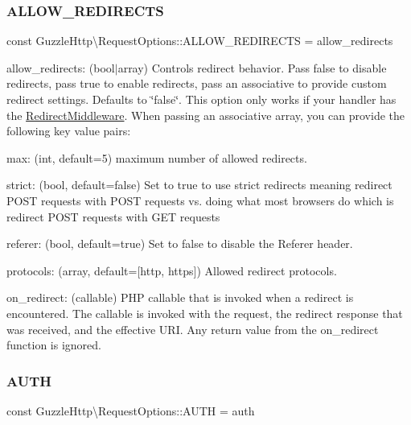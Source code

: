 \subsubsection{\texorpdfstring{A\+L\+L\+O\+W\+\_\+\+R\+E\+D\+I\+R\+E\+C\+TS}{ALLOW\_REDIRECTS}}
{\footnotesize\ttfamily const Guzzle\+Http\textbackslash{}\+Request\+Options\+::\+A\+L\+L\+O\+W\+\_\+\+R\+E\+D\+I\+R\+E\+C\+TS = \textquotesingle{}allow\+\_\+redirects\textquotesingle{}}

allow\+\_\+redirects\+: (bool$\vert$array) Controls redirect behavior. Pass false to disable redirects, pass true to enable redirects, pass an associative to provide custom redirect settings. Defaults to \char`\"{}false\char`\"{}. This option only works if your handler has the \hyperlink{classGuzzleHttp_1_1RedirectMiddleware}{Redirect\+Middleware}. When passing an associative array, you can provide the following key value pairs\+:


\begin{DoxyItemize}
\item max\+: (int, default=5) maximum number of allowed redirects.
\item strict\+: (bool, default=false) Set to true to use strict redirects meaning redirect P\+O\+ST requests with P\+O\+ST requests vs. doing what most browsers do which is redirect P\+O\+ST requests with G\+ET requests
\item referer\+: (bool, default=true) Set to false to disable the Referer header.
\item protocols\+: (array, default=\mbox{[}\textquotesingle{}http\textquotesingle{}, \textquotesingle{}https\textquotesingle{}\mbox{]}) Allowed redirect protocols.
\item on\+\_\+redirect\+: (callable) P\+HP callable that is invoked when a redirect is encountered. The callable is invoked with the request, the redirect response that was received, and the effective U\+RI. Any return value from the on\+\_\+redirect function is ignored. 
\end{DoxyItemize}\mbox{\label{classGuzzleHttp_1_1RequestOptions_a4eb12a240ccc24b944c8c605b46abe57}} 
\subsubsection{\texorpdfstring{A\+U\+TH}{AUTH}}
{\footnotesize\ttfamily const Guzzle\+Http\textbackslash{}\+Request\+Options\+::\+A\+U\+TH = \textquotesingle{}auth\textquotesingle{}}

